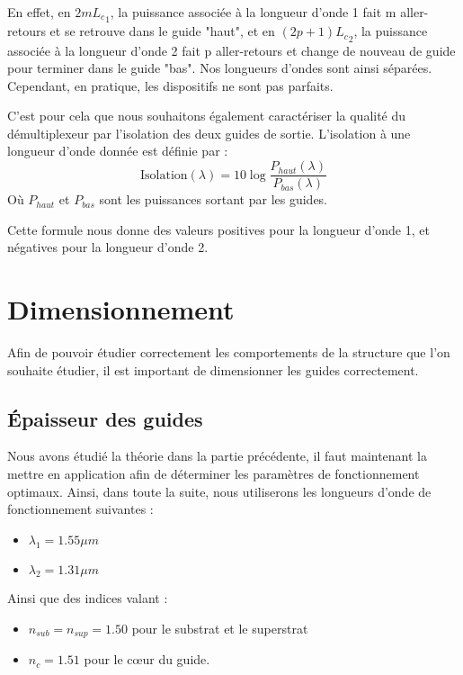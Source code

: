 \documentclass[a4paper,11pt]{report}
\begin{document}
En effet, en $2m{L_c}_1$, la puissance associée à la longueur d'onde 1 fait m aller-retours et se retrouve dans le guide "haut", et en $(2p+1){L_c}_2$, la puissance associée à la longueur d'onde 2 fait p aller-retours et change de nouveau de guide pour terminer dans le guide "bas". Nos longueurs d'ondes sont ainsi séparées. Cependant, en pratique, les dispositifs ne sont pas parfaits. 


%
%
C'est pour cela que nous souhaitons également caractériser la qualité du démultiplexeur par l'isolation des deux guides de sortie.
L'isolation à une longueur d'onde donnée est définie par :
\[
    \text{Isolation}(\lambda) = 10 \log\frac{P_{haut}(\lambda)}{P_{bas}(\lambda)}
\]
Où $P_{haut}$ et $P_{bas}$ sont les puissances sortant par les guides.

Cette formule nous donne des valeurs positives pour la longueur d'onde 1, et négatives pour la longueur d'onde 2.

\chapter{Dimensionnement}
Afin de pouvoir étudier correctement les comportements de la structure que l'on souhaite étudier, il est important de dimensionner les guides correctement.

\section{Épaisseur des guides}
Nous avons étudié la théorie dans la partie précédente, il faut maintenant la mettre en application afin de déterminer les paramètres de fonctionnement optimaux. Ainsi, dans toute la suite, nous utiliserons les longueurs d'onde de fonctionnement suivantes :
\begin{itemize}
    \item $\lambda_1=1.55\mu m$ 
    \item $\lambda_2=1.31\mu m$
\end{itemize}
Ainsi que des indices valant :
\begin{itemize}
    \item  $n_{sub}=n_{sup}=1.50$ pour le substrat et le superstrat
    \item  $n_{c}=1.51$ pour le cœur du guide.
    \newline
\end{itemize}
\end{document}
